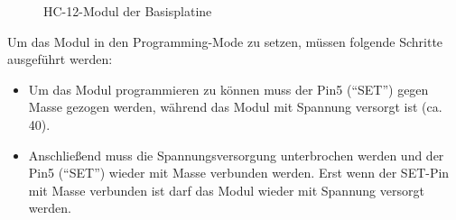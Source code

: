 \begin{figure}[htb]
    \centering
    \qquad
    \qquad
    \caption[HC-12-Modul der Basisplatine]{HC-12-Modul der \gls{Basisplatine}}
    \label{fig:basisplatine-hc12}
\end{figure}

Um das Modul in den Programming-Mode zu setzen, müssen folgende Schritte ausgeführt werden:
\begin{itemize}
    \item Um das Modul programmieren zu können muss der Pin5 (\enquote{SET}) gegen Masse gezogen werden, während das Modul mit Spannung versorgt ist (ca. \unit{40}{\milli\second}).
    \item Anschließend muss die Spannungsversorgung unterbrochen werden und der Pin5 (\enquote{SET}) wieder mit Masse verbunden werden. Erst wenn der SET-Pin mit Masse verbunden ist darf das Modul wieder mit Spannung versorgt werden.
\end{itemize}

